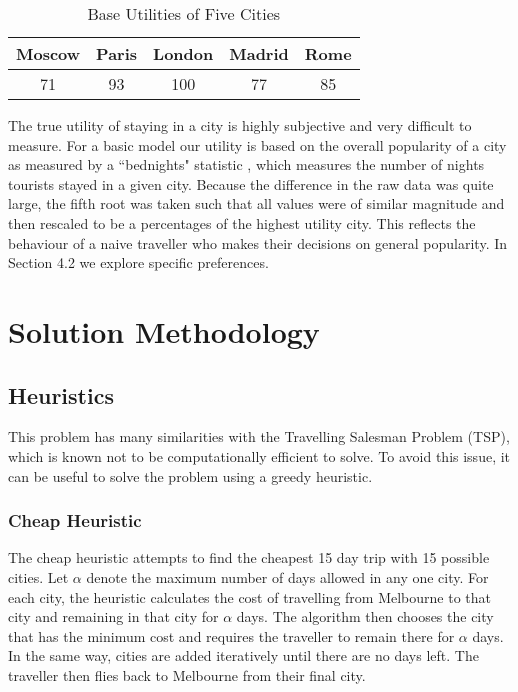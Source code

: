 \documentclass[12pt]{article}
\begin{document}
\begin{table}[h!]
\centering
\vspace{1mm}
\begin{tabular}{c|c|c|c|c}
\hline
\rule{0pt}{2ex} \textbf{Moscow} & \textbf{Paris} & \textbf{London} & \textbf{Madrid} & \textbf{Rome} \\
\hline
\rule{0pt}{2ex} 71 & 93 & 100 & 77 & 85 \\\hline
\end{tabular}
\caption{Base Utilities of Five Cities}
\end{table}
The true utility of staying in a city is highly subjective and very difficult to measure. For a basic model our utility is based on the overall popularity of a city as measured by a ``bednights" statistic \cite{euro}, which measures the number of nights tourists stayed in a given city. Because the difference in the raw data was quite large, the fifth root was taken such that all values were of similar magnitude and then rescaled to be a percentages of the highest utility city. This reflects the behaviour of a naive traveller who makes their decisions on general popularity. In Section 4.2 we explore specific preferences.

\pagebreak
\section{Solution Methodology} 
\label{sec:methods}


\subsection{Heuristics}

This problem has many similarities with the Travelling Salesman Problem (TSP), which is known not to be computationally efficient to solve. To avoid this issue, it can be useful to solve the problem using a greedy heuristic.

\subsubsection{Cheap Heuristic}

The cheap heuristic attempts to find the cheapest 15 day trip with 15 possible cities. Let $\alpha$ denote the maximum number of days allowed in any one city. For each city, the heuristic calculates the cost of travelling from Melbourne to that city and remaining in that city for $\alpha$ days. The algorithm then chooses the city that has the minimum cost and requires the traveller to remain there for $\alpha$ days. In the same way, cities are added iteratively until there are no days left. The traveller then flies back to Melbourne from their final city.
\end{document}

